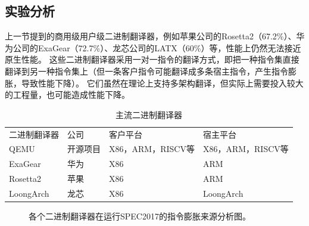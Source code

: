 \subsection{实验分析}

上一节提到的商用级用户级二进制翻译器，例如苹果公司的Rosetta2（67.2\%）、华为公司的ExaGear（72.7\%）、龙芯公司的LATX（60\%）等，性能上仍然无法接近原生性能。
这些二进制翻译器采用一对一指令的翻译方式，即把一种指令集直接翻译到另一种指令集上（但一条客户指令可能翻译成多条宿主指令，产生指令膨胀，导致性能下降）。
它们虽然在理论上支持多架构翻译，但实际上需要投入较大的工程量，也可能造成性能下降。

\begin{table}[]
\centering
\caption{主流二进制翻译器}
\label{tab:BTs}
  \begin{tabular}{llll}
  \rowcolor[HTML]{FBE5D6} 
  二进制翻译器    & 公司   & 客户平台           & 宿主平台           \\
  QEMU      & 开源项目 & X86，ARM，RISCV等 & X86，ARM，RISCV等  \\
  ExaGear   & 华为   & X86            & ARM            \\
  Rosetta2  & 苹果   & X86            & ARM            \\
  LoongArch & 龙芯   & X86            & LoongArch      
  \end{tabular}
  \end{table}

\begin{figure}[!htbp]
  \centering
  \caption{各个二进制翻译器在运行SPEC2017的指令膨胀来源分析图。}
  \label{img:insts_inflt_breakdown_2017}
\end{figure}

